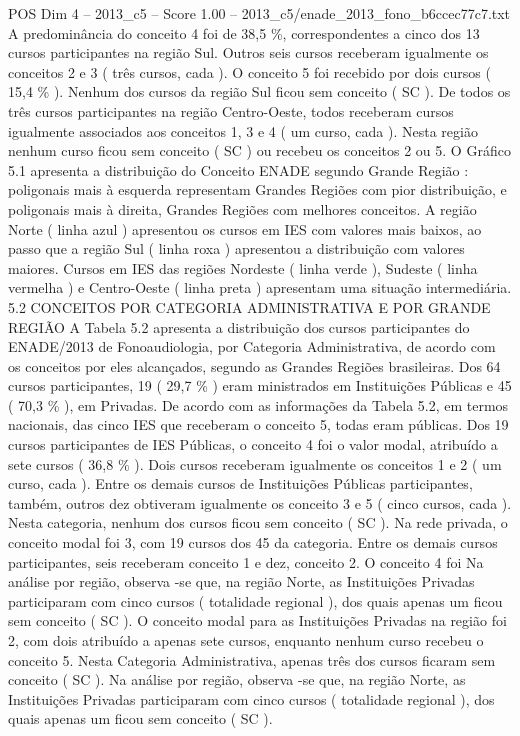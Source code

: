 \begin{textsample}{POS Dim 4 – 2013\_c5 – Score 1.00 – 2013\_c5/enade\_2013\_fono\_b6ccec77c7.txt}
A predominância do conceito 4 foi de 38,5 \%, correspondentes a cinco dos 13 cursos participantes na região Sul.
Outros seis cursos receberam igualmente os conceitos 2 e 3 ( três cursos, cada ).
O conceito 5 foi recebido por dois cursos ( 15,4 \% ).
Nenhum dos cursos da região Sul ficou sem conceito ( SC ).
De todos os três cursos participantes na região Centro-Oeste, todos receberam cursos igualmente associados aos conceitos 1, 3 e 4 ( um curso, cada ).
Nesta região nenhum curso ficou sem conceito ( SC ) ou recebeu os conceitos 2 ou 5.
O Gráfico 5.1 apresenta a distribuição do Conceito ENADE segundo Grande Região : poligonais mais à esquerda representam Grandes Regiões com pior distribuição, e poligonais mais à direita, Grandes Regiões com melhores conceitos.
A região Norte ( linha azul ) apresentou os cursos em IES com valores mais baixos, ao passo que a região Sul ( linha roxa ) apresentou a distribuição com valores maiores.
Cursos em IES das regiões Nordeste ( linha verde ), Sudeste ( linha vermelha ) e Centro-Oeste ( linha preta ) apresentam uma situação intermediária. 5.2 CONCEITOS POR CATEGORIA ADMINISTRATIVA E POR GRANDE REGIÃO A Tabela 5.2 apresenta a distribuição dos cursos participantes do ENADE/2013 de Fonoaudiologia, por Categoria Administrativa, de acordo com os conceitos por eles alcançados, segundo as Grandes Regiões brasileiras.
Dos 64 cursos participantes, 19 ( 29,7 \% ) eram ministrados em Instituições Públicas e 45 ( 70,3 \% ), em Privadas.
De acordo com as informações da Tabela 5.2, em termos nacionais, das cinco IES que receberam o conceito 5, todas eram públicas.
Dos 19 cursos participantes de IES Públicas, o conceito 4 foi o valor modal, atribuído a sete cursos ( 36,8 \% ).
Dois cursos receberam igualmente os conceitos 1 e 2 ( um curso, cada ).
Entre os demais cursos de Instituições Públicas participantes, também, outros dez obtiveram igualmente os conceito 3 e 5 ( cinco cursos, cada ).
Nesta categoria, nenhum dos cursos ficou sem conceito ( SC ).
Na rede privada, o conceito modal foi 3, com 19 cursos dos 45 da categoria.
Entre os demais cursos participantes, seis receberam conceito 1 e dez, conceito 2.
O conceito 4 foi Na análise por região, observa -se que, na região Norte, as Instituições Privadas participaram com cinco cursos ( totalidade regional ), dos quais apenas um ficou sem conceito ( SC ).
O conceito modal para as Instituições Privadas na região foi 2, com dois atribuído a apenas sete cursos, enquanto nenhum curso recebeu o conceito 5.
Nesta Categoria Administrativa, apenas três dos cursos ficaram sem conceito ( SC ).
Na análise por região, observa -se que, na região Norte, as Instituições Privadas participaram com cinco cursos ( totalidade regional ), dos quais apenas um ficou sem conceito ( SC ).

\end{textsample}
